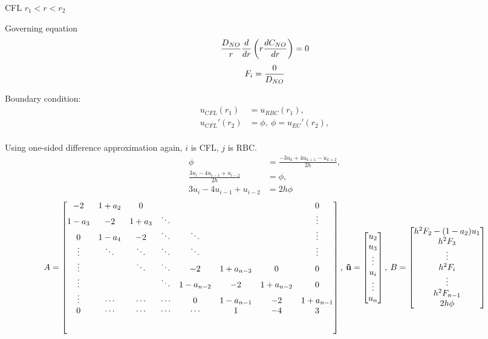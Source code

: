 \documentclass[8pt, a4paper]{article}
\begin{document}
  CFL $r_1<r<r_2$
  
  Governing equation
  \begin{equation*}
  \frac{D_{NO}}{r}\frac{d}{dr}\left(r\frac{dC_{NO}}{dr}\right)=0
  \end{equation*}
  \begin{equation*}
  F_i=\frac{0}{D_{NO}}
  \end{equation*}
  
  Boundary condition:
  \begin{align*}
  u_{CFL}(r_1)&=u_{RBC}(r_1),\\
  u_{CFL}'(r_2)&=\phi,\:\phi=u_{EC}'(r_2),\\
  \end{align*}
  
  Using one-sided difference approximation again, $i$ is CFL, $j$ is RBC.
  \begin{align*}
  \phi&=\frac{-3u_k+4u_{k+1}-u_{k+2}}{2h},\\
  \frac{3u_i-4u_{i-1}+u_{i-2}}{2h}&=\phi,\\
  3u_i-4u_{i-1}+u_{i-2}&=2h\phi
  \end{align*}
  \begin{equation}
  A=
  \begin{bmatrix}
  -2 & 1+a_2 & 0 & & & & & 0\\
  1-a_3 & -2 & 1+a_3 & \ddots & & & & \vdots\\
  0 & 1-a_4 & -2 & \ddots & \ddots & &  & \vdots\\
  \vdots & \ddots & \ddots & \ddots & \ddots & & & \vdots\\
  \vdots & & \ddots & \ddots & -2 & 1+a_{n-3} & 0 & 0\\
  \vdots & & & \ddots & 1-a_{n-2} & -2 & 1+a_{n-2} & 0\\
  \vdots & \cdots & \cdots & \cdots & 0 & 1-a_{n-1} & -2 & 1+a_{n-1}\\
  0 & \cdots & \cdots & \cdots & \cdots & 1 & -4 & 3\\[5ex]
  \end{bmatrix},\:
  \mathbf{\vec{u}}=
  \begin{bmatrix}
  u_2\\
  u_3\\
  \vdots\\
  u_i\\
  \vdots\\
  u_n
  \end{bmatrix},\:
  B=
  \begin{bmatrix}
  h^2F_2-(1-a_2)u_1\\
  h^2F_3\\
  \vdots\\
  h^2F_i\\
  \vdots\\
  h^2F_{n-1}\\
  2h\phi
  \end{bmatrix}
  \end{equation}
  
\end{document}
